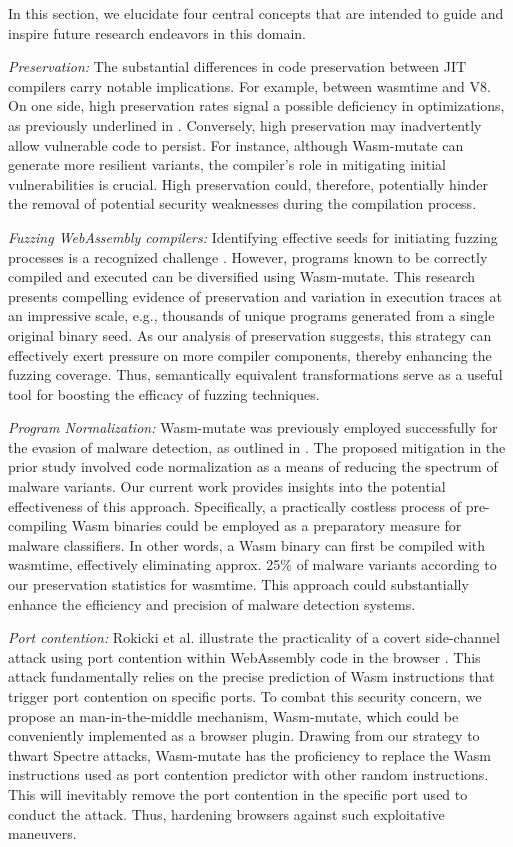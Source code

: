 \documentclass[sigplan,screen]{acmart}
\newcommand{\tool}{Wasm-mutate\xspace}
\newcommand{\wasm}{Wasm\xspace}
\newcommand{\Wasm}{WebAssembly\xspace}
\begin{document}
In this section, we elucidate four central concepts that are intended to guide and inspire future research endeavors in this domain.

\emph{Preservation:} The substantial differences in code preservation between JIT compilers carry notable implications. 
For example, between wasmtime and V8.
On one side, high preservation rates signal a possible deficiency in optimizations, as previously underlined in \cite{wasmslim}. 
Conversely, high preservation may inadvertently allow vulnerable code to persist.
For instance, although \tool can generate more resilient variants, the compiler's role in mitigating initial vulnerabilities is crucial. 
High preservation could, therefore, potentially hinder the removal of potential security weaknesses during the compilation process.


\emph{Fuzzing \Wasm compilers:}  
Identifying effective seeds for initiating fuzzing processes is a recognized challenge \cite{7958599}. 
However, programs known to be correctly compiled and executed can be diversified using \tool.
This research presents compelling evidence of preservation and variation in execution traces at an impressive scale, e.g., thousands of unique programs generated from a single original binary seed. 
As our analysis of preservation suggests, this strategy can effectively exert pressure on more compiler components, thereby enhancing the fuzzing coverage.
Thus, semantically equivalent transformations serve as a useful tool for boosting the efficacy of fuzzing techniques.


\emph{Program Normalization:} \tool was previously employed successfully for the evasion of malware detection, as outlined in \cite{CABRERAARTEAGA2023103296}. 
The proposed mitigation in the prior study involved code normalization as a means of reducing the spectrum of malware variants. 
Our current work provides insights into the potential effectiveness of this approach. 
Specifically, a practically costless process of pre-compiling Wasm binaries could be employed as a preparatory measure for malware classifiers. 
In other words, a \wasm binary can first be compiled with wasmtime, effectively eliminating approx. 25\% of malware variants according to our preservation statistics for wasmtime. 
This approach could substantially enhance the efficiency and precision of malware detection systems.

\emph{Port contention:} 
Rokicki et al. illustrate the practicality of a covert side-channel attack using port contention within \Wasm code in the browser \cite{10.1145/3488932.3517411}. This attack fundamentally relies on the precise prediction of Wasm instructions that trigger port contention on specific ports.
To combat this security concern, we propose an man-in-the-middle mechanism, \tool, which could be conveniently implemented as a browser plugin. 
Drawing from our strategy to thwart Spectre attacks, \tool has the proficiency to replace the \wasm instructions used as port contention predictor with other random instructions.
This will inevitably remove the port contention in the specific port used to conduct the attack.
Thus, hardening browsers against such exploitative maneuvers.
\end{document}
